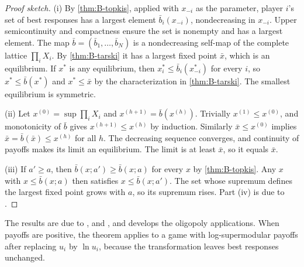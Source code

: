 \begin{proof}[Proof sketch]
(i) By \cref{thm:B-topkis}, applied with $x_{-i}$ as the parameter, player $i$'s set of best responses has a largest
element $\bar b_i(x_{-i})$, nondecreasing in $x_{-i}$. Upper semicontinuity and compactness ensure the set is
nonempty and has a largest element. The map $\bar b = (\bar b_1, \dots, \bar b_N)$ is a nondecreasing self-map of the
complete lattice $\prod_iX_i$. By \cref{thm:B-tarski} it has a largest fixed point $\bar x$, which is an equilibrium. If
$x^*$ is any equilibrium, then $x_i^* \leq \bar b_i(x_{-i}^*)$ for every $i$, so $x^* \leq \bar b(x^*)$ and $x^* \leq \bar x$ by the
characterization in \cref{thm:B-tarski}. The smallest equilibrium is symmetric.

(ii) Let $x^{(0)} = \sup\prod_iX_i$ and $x^{(h+1)} = \bar b(x^{(h)})$. Trivially $x^{(1)} \leq x^{(0)}$, and monotonicity of
$\bar b$ gives $x^{(h+1)} \leq x^{(h)}$ by induction. Similarly $\bar x \leq x^{(0)}$ implies $\bar x = \bar b(\bar x) \leq x^{(h)}$
for all $h$. The decreasing sequence converges, and continuity of payoffs makes its limit an equilibrium. The
limit is at least $\bar x$, so it equals $\bar x$.

(iii) If $a' \geq a$, then $\bar b(x; a') \geq \bar b(x; a)$ for every $x$ by \cref{thm:B-topkis}. Any $x$ with $x \leq \bar b(x; a)$
then satisfies $x \leq \bar b(x; a')$. The set whose supremum defines the largest fixed point grows with $a$, so its
supremum rises. Part (iv) is due to \citet{MilgromRoberts1990}.
\end{proof}

The results are due to \citet{Topkis1979}, \citet{Vives1990} and \citet{MilgromRoberts1990}, and \citet{Vives1999}
develops the oligopoly applications. When payoffs are positive, the theorem applies to a game with
log-supermodular payoffs after replacing $u_i$ by $\ln u_i$, because the transformation leaves best responses unchanged.

